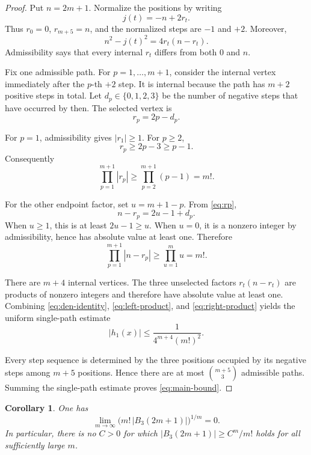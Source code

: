\documentclass[11pt]{article}
\newtheorem{corollary}[theorem]{Corollary}
\begin{document}
\begin{proof}
Put $n=2m+1$.  Normalize the positions by writing
\[
 j(t)=-n+2r_t.
\]
Thus $r_0=0$, $r_{m+5}=n$, and the normalized steps are $-1$ and $+2$.
Moreover,
\begin{equation}\label{eq:den-identity}
 n^2-j(t)^2=4r_t(n-r_t).
\end{equation}
Admissibility says that every internal $r_t$ differs from both $0$ and $n$.

Fix one admissible path.  For $p=1,\ldots,m+1$, consider the internal vertex
immediately after the $p$-th $+2$ step.  It is internal because the path has
$m+2$ positive steps in total.  Let $d_p\in\{0,1,2,3\}$ be the number of
negative steps that have occurred by then.  The selected vertex is
\begin{equation}\label{eq:rp}
 r_p=2p-d_p.
\end{equation}

For $p=1$, admissibility gives $|r_1|\geq1$.  For $p\geq2$,
\[
 r_p\geq2p-3\geq p-1.
\]
Consequently
\begin{equation}\label{eq:left-product}
 \prod_{p=1}^{m+1}|r_p|\geq\prod_{p=2}^{m+1}(p-1)=m!.
\end{equation}

For the other endpoint factor, set $u=m+1-p$.  From \eqref{eq:rp},
\[
 n-r_p=2u-1+d_p.
\]
When $u\geq1$, this is at least $2u-1\geq u$.  When $u=0$, it is a nonzero
integer by admissibility, hence has absolute value at least one.  Therefore
\begin{equation}\label{eq:right-product}
 \prod_{p=1}^{m+1}|n-r_p|\geq\prod_{u=1}^{m}u=m!.
\end{equation}

There are $m+4$ internal vertices.  The three unselected factors
$r_t(n-r_t)$ are products of nonzero integers and therefore have absolute
value at least one.  Combining \eqref{eq:den-identity},
\eqref{eq:left-product}, and \eqref{eq:right-product} yields the uniform
single-path estimate
\[
 |h_1(x)|\leq\frac{1}{4^{m+4}(m!)^2}.
\]

Every step sequence is determined by the three positions occupied by its
negative steps among $m+5$ positions.  Hence there are at most
$\binom{m+5}{3}$ admissible paths.  Summing the single-path estimate proves
\eqref{eq:main-bound}.
\end{proof}

\begin{corollary}\label{cor:no-C}
One has
\[
 \lim_{m\to\infty}\bigl(m!\,|B_3(2m+1)|\bigr)^{1/m}=0.
\]
In particular, there is no $C>0$ for which
$|B_3(2m+1)|\geq C^m/m!$ holds for all sufficiently large $m$.
\end{corollary}
\end{document}
